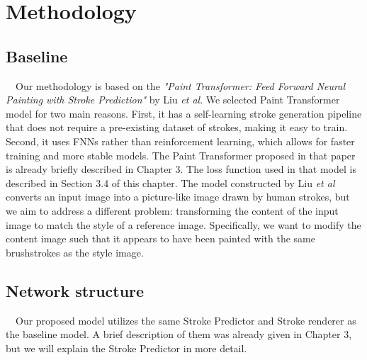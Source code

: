 \chapter{Methodology}

\section{Baseline}
　Our methodology is based on the \textit{"Paint Transformer: Feed Forward Neural Painting with Stroke Prediction"}
by Liu \textit{et al}. We selected Paint Transformer model for two main reasons. 
First, it has a self-learning stroke generation pipeline that does not require 
a pre-existing dataset of strokes, making it easy to train. Second, it uses 
FNNs rather than reinforcement learning, which allows for faster training and 
more stable models.
The Paint Transformer proposed in that paper is already briefly described in 
Chapter 3. The loss function used in that model is described in Section 3.4 
of this chapter. 
The model constructed by Liu \textit{et al} converts an input image into a 
picture-like image drawn by human strokes, but  we aim to address a different 
problem: transforming the content of the input image to match the style of a 
reference image. Specifically, we want to modify the content image such that 
it appears to have been painted with the same brushstrokes as the style image. 

\section{Network structure}
　Our proposed model utilizes the same Stroke Predictor and Stroke renderer 
as the baseline model.
A brief description of them was already given in Chapter 3, but we will explain
the Stroke Predictor in more detail.


